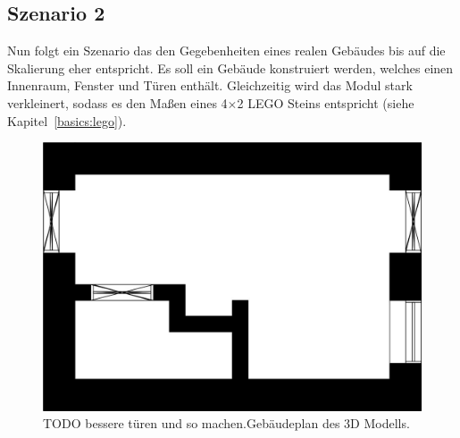 \subsection{Szenario 2}\label{scenarios:scenario2}
Nun folgt ein Szenario das den Gegebenheiten eines realen Gebäudes bis auf die Skalierung eher entspricht.
Es soll ein Gebäude konstruiert werden, welches einen Innenraum, Fenster und Türen enthält.
Gleichzeitig wird das Modul stark verkleinert, sodass es den Maßen eines 4$\times$2 LEGO Steins entspricht (siehe Kapitel~\ref{basics:lego}).

\begin{figure}[ht]
  \centering
  \includegraphics[width=0.505\columnwidth]{fig/scenario1_story_plan.jpg}
  \caption{TODO bessere türen und so machen.Gebäudeplan des 3D Modells.}\label{fig:scenarios:Scenario1 Gebaeudeplan}
\end{figure}

